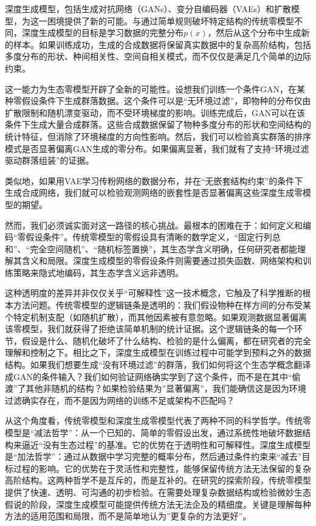 \documentclass[
  twoside,12pt,fontset=none]{ctexbook}
\begin{document}
深度生成模型，包括生成对抗网络（GANs）、变分自编码器（VAEs）和扩散模型，为这一困境提供了新的可能。与通过简单规则破坏特定结构的传统零模型不同，深度生成模型的目标是学习数据的完整分布\(p(x)\)，然后从这个分布中生成新的样本。如果训练成功，生成的合成数据将保留真实数据中的复杂高阶结构，包括多度分布的形状、种间相关性、空间自相关模式，而不仅仅是满足几个简单的边际约束。

这一能力为生态零模型开辟了全新的可能性。设想我们训练一个条件GAN，在某种零假设条件下生成群落数据。这个条件可以是``无环境过滤''，即物种的分布仅由扩散限制和随机漂变驱动，而不受环境梯度的影响。训练完成后，GAN可以在该条件下生成大量合成群落。这些合成数据保留了物种多度分布的形状和空间结构的统计特征，但消除了环境梯度的方向性影响。然后，我们可以检验真实群落的排序模式是否显著偏离GAN生成的零分布。如果偏离显著，我们就有了支持``环境过滤驱动群落组装''的证据。

类似地，如果用VAE学习传粉网络的数据分布，并在``无嵌套结构约束''的条件下生成合成网络，我们就可以检验观测网络的嵌套性是否显著偏离这些深度生成零模型的期望。

然而，我们必须诚实面对这一路径的核心挑战。最根本的困难在于：如何定义和编码``零假设条件''。传统零模型的零假设具有清晰的数学定义，``固定行列总和''、``完全空间随机''、``随机标签置换''，其生态学含义明确，任何研究者都能理解其含义和局限。深度生成模型的零假设条件则需要通过损失函数、网络架构和训练策略来隐式地编码，其生态学含义远非透明。

这种透明度的差异并非仅仅关乎``可解释性''这一技术概念，它触及了科学推断的根本方法问题。传统零模型的逻辑链条是透明的：我们假设物种在样方间的分布受某个特定机制支配（如随机扩散），而其他因素被有意忽略。如果观测数据显著偏离该零模型，我们就获得了拒绝该简单机制的统计证据。这个逻辑链条的每一个环节，假设是什么、随机化破坏了什么结构、检验的是什么偏离，都在研究者的完全理解和控制之下。相比之下，深度生成模型在训练过程中可能学到预料之外的数据结构。如果我们想要生成``没有环境过滤''的群落，我们如何将这个生态学概念翻译成GAN的条件输入？我们如何验证网络确实学到了这个条件，而不是在其中``偷渡''了其他非随机的结构？如果检验结果为''显著偏离''，我们能确信这是因为环境过滤确实存在，而不是因为网络的训练不足或架构不匹配吗？

从这个角度看，传统零模型和深度生成零模型代表了两种不同的科学哲学。传统零模型是``减法哲学''：从一个已知的、简单的零假设出发，通过系统性地破坏数据结构来逼近``没有生态过程''的基准。它的优势在于透明性和可解释性。深度生成模型是``加法哲学''：通过从数据中学习完整的概率分布，然后通过条件约束来``减去''目标过程的影响。它的优势在于灵活性和完整性，能够保留传统方法无法保留的复杂高阶结构。这两种哲学不是互斥的，而是互补的。在研究的探索阶段，传统零模型提供了快速、透明、可沟通的初步检验。在需要处理复杂数据结构或检验微妙生态假说的阶段，深度生成模型可能提供传统方法无法企及的精细度。关键是理解每种方法的适用范围和局限，而不是简单地认为''更复杂的方法更好''。
\end{document}
